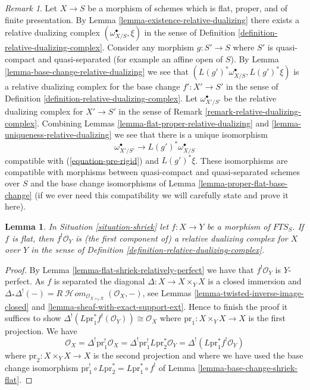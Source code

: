 \documentclass{stacks-project}
\theoremstyle{plain}
\newtheorem{lemma}[subsection]{Lemma}
\theoremstyle{definition}
\theoremstyle{remark}
\newtheorem{remark}[subsection]{Remark}
\numberwithin{equation}{subsection}
\def\SheafHom{\mathop{\mathcal{H}\!\mathit{om}}\nolimits}
\begin{document}
\begin{remark}
\label{remark-relative-dualizing-complex-bis}
Let $X \to S$ be a morphism of schemes which is flat, proper, and
of finite presentation. By Lemma \ref{lemma-existence-relative-dualizing}
there exists a relative dualizing complex $(\omega_{X/S}^\bullet, \xi)$
in the sense of Definition \ref{definition-relative-dualizing-complex}.
Consider any morphism $g : S' \to S$ where $S'$ is quasi-compact and
quasi-separated (for example an affine open of $S$).
By Lemma \ref{lemma-base-change-relative-dualizing}
we see that $(L(g')^*\omega_{X/S}^\bullet, L(g')^*\xi)$ is
a relative dualizing complex for the base change $f' : X' \to S'$
in the sense of Definition \ref{definition-relative-dualizing-complex}.
Let $\omega_{X'/S'}^\bullet$ be the relative dualizing complex
for $X' \to S'$ in the sense of Remark \ref{remark-relative-dualizing-complex}.
Combining Lemmas \ref{lemma-flat-proper-relative-dualizing} and
\ref{lemma-uniqueness-relative-dualizing}
we see that there is a unique isomorphism
$$
\omega_{X'/S'}^\bullet \longrightarrow L(g')^*\omega_{X/S}^\bullet
$$
compatible with (\ref{equation-pre-rigid}) and $L(g')^*\xi$.
These isomorphisms are compatible with morphisms between
quasi-compact and quasi-separated schemes over $S$
and the base change isomorphisms of Lemma \ref{lemma-proper-flat-base-change}
(if we ever need this compatibility we will carefully state and prove
it here).
\end{remark}

\begin{lemma}
\label{lemma-compactifyable-relative-dualizing}
In Situation \ref{situation-shriek} let $f : X \to Y$
be a morphism of $\textit{FTS}_S$. If $f$ is flat, then
$f^!\mathcal{O}_Y$ is (the first component of)
a relative dualizing complex for $X$ over $Y$ in the sense of
Definition \ref{definition-relative-dualizing-complex}.
\end{lemma}

\begin{proof}
By Lemma \ref{lemma-flat-shriek-relatively-perfect}
we have that $f^!\mathcal{O}_Y$
is $Y$-perfect. As $f$ is separated the diagonal
$\Delta : X \to X \times_Y X$ is a closed immersion and
$\Delta_*\Delta^!(-) =
R\SheafHom_{\mathcal{O}_{X \times_Y X}}(\mathcal{O}_X, -)$, see
Lemmas
\ref{lemma-twisted-inverse-image-closed} and
\ref{lemma-sheaf-with-exact-support-ext}.
Hence to finish the proof it suffices to show
$\Delta^!(L\text{pr}_1^*f^!(\mathcal{O}_Y)) \cong \mathcal{O}_X$
where $\text{pr}_1 : X \times_Y X \to X$ is the first projection.
We have
$$
\mathcal{O}_X = \Delta^! \text{pr}_1^!\mathcal{O}_X =
\Delta^! \text{pr}_1^! L\text{pr}_2^*\mathcal{O}_Y =
\Delta^!(L\text{pr}_1^* f^!\mathcal{O}_Y)
$$
where $\text{pr}_2 : X \times_Y X \to X$ is the second projection
and where we have used the base change isomorphism
$\text{pr}_1^! \circ L\text{pr}_2^* = L\text{pr}_1^* \circ f^!$ of
Lemma \ref{lemma-base-change-shriek-flat}.
\end{proof}
\end{document}
